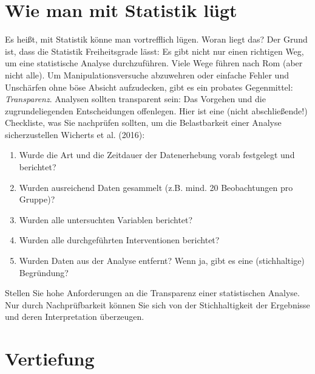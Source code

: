 \documentclass[
  letterpaper,
  twoside,
  open=any]{scrbook}
\providecommand{\tightlist}{%
  \setlength{\itemsep}{0pt}\setlength{\parskip}{0pt}}\usepackage{longtable,booktabs,array}
\theoremstyle{definition}
\theoremstyle{definition}
\theoremstyle{definition}
\theoremstyle{remark}
\begin{document}
\section{Wie man mit Statistik
lügt}\label{wie-man-mit-statistik-luxfcgt-2}

Es heißt, mit Statistik könne man vortrefflich lügen. Woran liegt das?
Der Grund ist, dass die Statistik Freiheitsgrade lässt: Es gibt nicht
nur einen richtigen Weg, um eine statistische Analyse durchzuführen.
Viele Wege führen nach Rom (aber nicht alle). Um Manipulationsversuche
abzuwehren oder einfache Fehler und Unschärfen ohne böse Absicht
aufzudecken, gibt es ein probates Gegenmittel: \emph{Transparenz}.
Analysen sollten transparent sein: Das Vorgehen und die
zugrundeliegenden Entscheidungen offenlegen. Hier ist eine (nicht
abschließende!) Checkliste, was Sie nachprüfen sollten, um die
Belastbarkeit einer Analyse sicherzustellen Wicherts et al. (2016):

\begin{enumerate}
\def\labelenumi{\arabic{enumi}.}
\tightlist
\item
  Wurde die Art und die Zeitdauer der Datenerhebung vorab festgelegt und
  berichtet?
\item
  Wurden ausreichend Daten gesammelt (z.B. mind. 20 Beobachtungen pro
  Gruppe)?
\item
  Wurden alle untersuchten Variablen berichtet?
\item
  Wurden alle durchgeführten Interventionen berichtet?
\item
  Wurden Daten aus der Analyse entfernt? Wenn ja, gibt es eine
  (stichhaltige) Begründung?
\end{enumerate}

\label{callout-important}
Stellen Sie hohe Anforderungen an die Transparenz einer statistischen
Analyse. Nur durch Nachprüfbarkeit können Sie sich von der
Stichhaltigkeit der Ergebnisse und deren Interpretation überzeugen.

\section{Vertiefung}\label{vertiefung-4}
\end{document}

